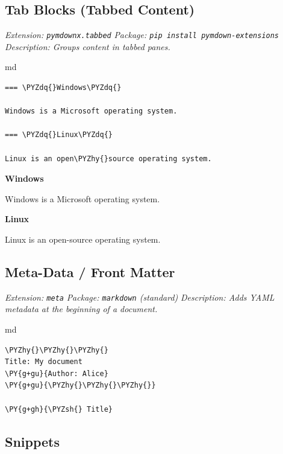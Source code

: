 \documentclass[a4paper,twoside]{article}
\begin{document}
\subsection{Tab Blocks (Tabbed Content)}\label{tab-blocks-tabbed-content}

\emph{Extension: \texttt{pymdownx.tabbed}}
\emph{Package: \texttt{pip install pymdown-\allowbreak{}extensions}}
\emph{Description: Groups content in tabbed panes.}

\begin{code}{md}{}{}
\begin{Verbatim}[commandchars=\\\{\},breaklines, breakanywhere, commandchars=\\\{\}]
=== \PYZdq{}Windows\PYZdq{}

Windows is a Microsoft operating system.

=== \PYZdq{}Linux\PYZdq{}

Linux is an open\PYZhy{}source operating system.
\end{Verbatim}
\end{code}
\textbf{Windows}\par

Windows is a Microsoft operating system.

\textbf{Linux}\par

Linux is an open-source operating system.

\subsection{Meta-Data / Front Matter}\label{meta-data-front-matter}

\emph{Extension: \texttt{meta}}
\emph{Package: \texttt{markdown} (standard)}
\emph{Description: Adds YAML metadata at the beginning of a document.}

\begin{code}{md}{}{}
\begin{Verbatim}[commandchars=\\\{\},breaklines, breakanywhere, commandchars=\\\{\}]
\PYZhy{}\PYZhy{}\PYZhy{}
Title: My document
\PY{g+gu}{Author: Alice}
\PY{g+gu}{\PYZhy{}\PYZhy{}\PYZhy{}}

\PY{g+gh}{\PYZsh{} Title}
\end{Verbatim}
\end{code}
\subsection{Snippets}\label{snippets}
\end{document}
